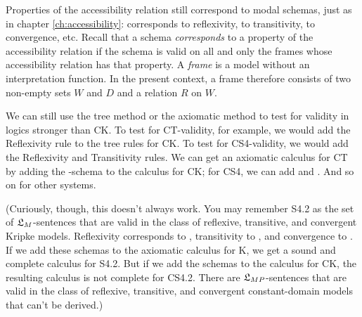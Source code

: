 Properties of the accessibility relation still correspond to modal schemas, just
as in chapter \ref{ch:accessibility}:  corresponds to reflexivity, 
to transitivity,  to convergence, etc. Recall that a schema
\emph{corresponds} to a property of the accessibility relation if the schema is
valid on all and only the frames whose accessibility relation has that
property. A \emph{frame} is a model without an interpretation function. In the
present context, a frame therefore consists of two non-empty sets $W$ and $D$ and a
relation $R$ on $W$.

We can still use the tree method or the axiomatic method to test for validity in
logics stronger than CK. To test for CT-validity, for example, we would add the
Reflexivity rule to the tree rules for CK. To test for CS4-validity, we would
add the Reflexivity and Transitivity rules. We can get an axiomatic calculus for
CT by adding the -schema to the calculus for CK; for CS4, we can add
 and . And so on for other systems.


(Curiously, though, this doesn't always work. You may remember S4.2 as the set of
$\mathfrak{L}_M$-sentences that are valid in the class of reflexive, transitive, and
convergent Kripke models. Reflexivity corresponds to , transitivity to
, and convergence to . If we add these schemas to the axiomatic
calculus for K, we get a sound and complete calculus for S4.2. But if we add the
schemas to the calculus for CK, the resulting calculus is not complete for
CS4.2. There are $\mathfrak{L}_{MP}$-sentences that are valid in the class of reflexive,
transitive, and convergent constant-domain models that can't be derived.)

%
%
%
%


